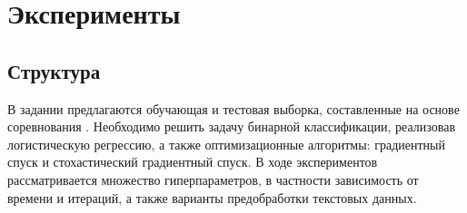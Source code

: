 \documentclass[12pt]{article}
\renewcommand{\vec}[1]{\mathbf{#1}}
\newcommand{\pder}[2][]{\frac{\partial#1}{\partial#2}}
\newcommand\mbtw[1]{{\color{gray}#1}}
\begin{document}

\section{Эксперименты}

\subsection{Структура}
В задании предлагаются обучающая и тестовая выборка, составленные на основе соревнования \cite{kaggle}. Необходимо решить задачу бинарной классификации, реализовав логистическую регрессию, а также оптимизационные алгоритмы: градиентный спуск и стохастический градиентный спуск. В ходе экспериментов рассматривается множество гиперпараметров, в частности зависимость от времени и итераций, а также варианты предобработки текстовых данных.
\end{document}
